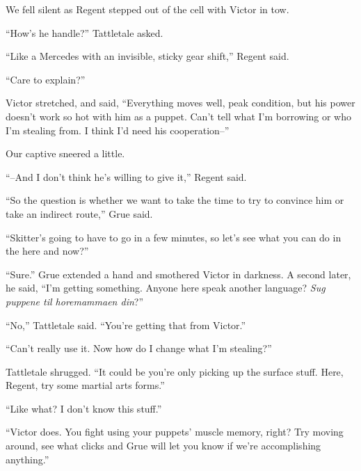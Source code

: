 





We fell silent as Regent stepped out of the cell with Victor in tow.



``How's he handle?'' Tattletale asked.



``Like a Mercedes with an invisible, sticky gear shift,'' Regent said.



``Care to explain?''



Victor stretched, and said, ``Everything moves well, peak condition, but his power doesn't work so hot with him as a puppet.  Can't tell what I'm borrowing or who I'm stealing from.  I think I'd need his cooperation--''



Our captive sneered a little.



``--And I don't think he's willing to give it,'' Regent said.



``So the question is whether we want to take the time to try to convince him or take an indirect route,'' Grue said.



``Skitter's going to have to go in a few minutes, so let's see what you can do in the here and now?''



``Sure.''  Grue extended a hand and smothered Victor in darkness.  A second later, he said, ``I'm getting something.  Anyone here speak another language? \emph{Sug puppene til horemammaen din}?''



``No,'' Tattletale said.  ``You're getting that from Victor.''



``Can't really use it.  Now how do I change what I'm stealing?''



Tattletale shrugged.  ``It could be you're only picking up the surface stuff.  Here, Regent, try some martial arts forms.''



``Like what?  I don't know this stuff.''



``Victor does.  You fight using your puppets' muscle memory, right?  Try moving around, see what clicks and Grue will let you know if we're accomplishing anything.''



